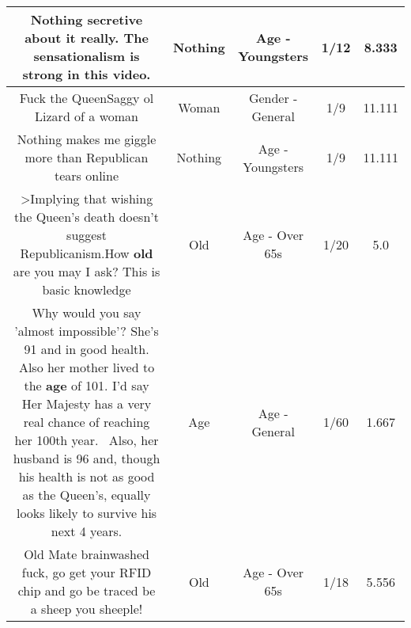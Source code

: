 \documentclass[11pt]{article}
\newlength\mylength
\begin{document}
\begin{center}
\begin{longtable}{|C{.65\mylength}|C{.30\mylength}|C{.12\mylength}|C{.12\mylength}|C{.12\mylength}|}
  \small Nothing secretive about it really. The sensationalism is strong in this video.\normalsize   & Nothing & Age - Youngsters & 1/12 & 8.333 \\  \hline
  \small Fuck the QueenSaggy ol Lizard of a woman\normalsize   & Woman & Gender - General & 1/9 & 11.111 \\  \hline
  \small Nothing makes me giggle more than Republican tears online\normalsize   & Nothing & Age - Youngsters & 1/9 & 11.111 \\  \hline
  \small >Implying that wishing the Queen's death doesn't suggest Republicanism.How \textbf{old} are you may I ask? This is basic knowledge\normalsize   & Old & Age - Over 65s & 1/20 & 5.0 \\  \hline
  \small Why would you say 'almost impossible'? She's 91 and in good health. Also her mother lived to the \textbf{age} of 101. I'd say Her Majesty has a very real chance of reaching her 100th year.  Also, her husband is 96 and, though his health is not as good as the Queen's, equally looks likely to survive his next 4 years.\normalsize   & Age & Age - General & 1/60 & 1.667 \\  \hline
  \small Old Mate brainwashed fuck, go get your RFID chip and go be traced be a sheep you sheeple!\normalsize   & Old & Age - Over 65s & 1/18 & 5.556 \\  \hline

\end{longtable}
\end{center}
\end{document}
